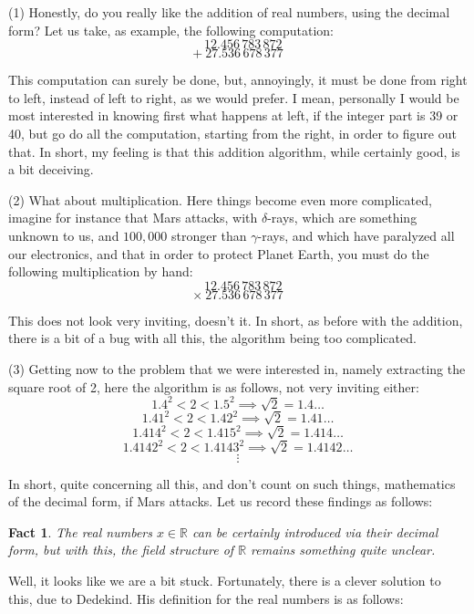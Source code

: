 \documentclass[12pt]{amsbook}
\newtheorem{fact}[theorem]{Fact}
\begin{document}
(1) Honestly, do you really like the addition of real numbers, using the decimal form? Let us take, as example, the following computation:
$$\ \ \ \,12.456\,783\,872$$
$$+\ 27.536\,678\,377$$

This computation can surely be done, but, annoyingly, it must be done from right to left, instead of left to right, as we would prefer. I mean, personally I would be most interested in knowing first what happens at left, if the integer part is 39 or 40, but go do all the computation, starting from the right, in order to figure out that. In short, my feeling is that this addition algorithm, while certainly good, is a bit deceiving.

\bigskip

(2) What about multiplication. Here things become even more complicated, imagine for instance that Mars attacks, with $\delta$-rays, which are something unknown to us, and $100,000$ stronger than $\gamma$-rays, and which have paralyzed all our electronics, and that in order to protect Planet Earth, you must do the following multiplication by hand:
$$\ \ \ \,12.456\,783\,872$$
$$\times\ 27.536\,678\,377$$

This does not look very inviting, doesn't it. In short, as before with the addition, there is a bit of a bug with all this, the algorithm being too complicated.

\bigskip

(3) Getting now to the problem that we were interested in, namely extracting the square root of 2, here the algorithm is as follows, not very inviting either:
$$1.4^2<2<1.5^2\implies\sqrt{2}=1.4\ldots$$
$$1.41^2<2<1.42^2\implies\sqrt{2}=1.41\ldots$$
$$1.414^2<2<1.415^2\implies\sqrt{2}=1.414\ldots$$
$$1.4142^2<2<1.4143^2\implies\sqrt{2}=1.4142\ldots$$
$$\vdots$$

In short, quite concerning all this, and don't count on such things, mathematics of the decimal form, if Mars attacks. Let us record these findings as follows:

\begin{fact}
The real numbers $x\in\mathbb R$ can be certainly introduced via their decimal form, but with this, the field structure of $\mathbb R$ remains something quite unclear.
\end{fact}

Well, it looks like we are a bit stuck. Fortunately, there is a clever solution to this, due to Dedekind. His definition for the real numbers is as follows:

\end{document}
